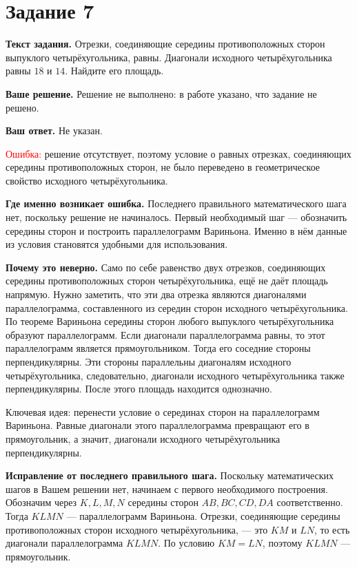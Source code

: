 \documentclass[12pt,a4paper]{article}
\begin{document}
\newpage
{}\label{task:7}
\section*{Задание 7}

\textbf{Текст задания.}
Отрезки, соединяющие середины противоположных сторон выпуклого четырёхугольника, равны. Диагонали исходного четырёхугольника равны $18$ и $14$. Найдите его площадь.

\textbf{Ваше решение.}
Решение не выполнено: в работе указано, что задание не решено.

\textbf{Ваш ответ.}
Не указан.

\textcolor{red}{Ошибка:} решение отсутствует, поэтому условие о равных отрезках, соединяющих середины противоположных сторон, не было переведено в геометрическое свойство исходного четырёхугольника.

\textbf{Где именно возникает ошибка.}
Последнего правильного математического шага нет, поскольку решение не начиналось. Первый необходимый шаг --- обозначить середины сторон и построить параллелограмм Вариньона. Именно в нём данные из условия становятся удобными для использования.

\textbf{Почему это неверно.}
Само по себе равенство двух отрезков, соединяющих середины противоположных сторон четырёхугольника, ещё не даёт площадь напрямую. Нужно заметить, что эти два отрезка являются диагоналями параллелограмма, составленного из середин сторон исходного четырёхугольника. По теореме Вариньона середины сторон любого выпуклого четырёхугольника образуют параллелограмм. Если диагонали параллелограмма равны, то этот параллелограмм является прямоугольником. Тогда его соседние стороны перпендикулярны. Эти стороны параллельны диагоналям исходного четырёхугольника, следовательно, диагонали исходного четырёхугольника также перпендикулярны. После этого площадь находится однозначно.

\textcolor{blue!60!black}{Ключевая идея:} перенести условие о серединах сторон на параллелограмм Вариньона. Равные диагонали этого параллелограмма превращают его в прямоугольник, а значит, диагонали исходного четырёхугольника перпендикулярны.

\textbf{Исправление от последнего правильного шага.}
Поскольку математических шагов в Вашем решении нет, начинаем с первого необходимого построения. Обозначим через $K,L,M,N$ середины сторон $AB,BC,CD,DA$ соответственно. Тогда $KLMN$ --- параллелограмм Вариньона. Отрезки, соединяющие середины противоположных сторон исходного четырёхугольника, --- это $KM$ и $LN$, то есть диагонали параллелограмма $KLMN$. По условию $KM=LN$, поэтому $KLMN$ --- прямоугольник.
\end{document}
